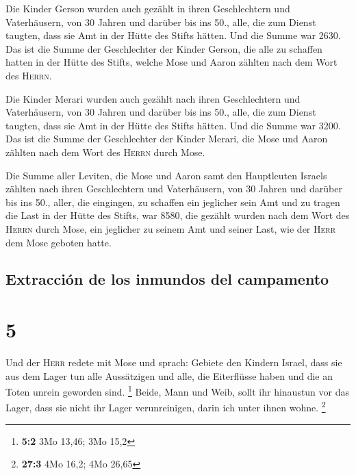  Die Kinder Gerson wurden auch gezählt in ihren
Geschlechtern und Vaterhäusern,  von 30 Jahren und
darüber bis ins 50., alle, die zum Dienst taugten, dass sie Amt in der
Hütte des Stifts hätten.  Und die Summe war 2630.
 Das ist die Summe der Geschlechter der Kinder Gerson,
die alle zu schaffen hatten in der Hütte des Stifts, welche Mose und
Aaron zählten nach dem Wort des \textsc{Herrn}.

 Die Kinder Merari wurden auch gezählt nach ihren
Geschlechtern und Vaterhäusern,  von 30 Jahren und
darüber bis ins 50., alle, die zum Dienst taugten, dass sie Amt in der
Hütte des Stifts hätten.  Und die Summe war 3200.
 Das ist die Summe der Geschlechter der Kinder Merari,
die Mose und Aaron zählten nach dem Wort des \textsc{Herrn} durch Mose.

 Die Summe aller Leviten, die Mose und Aaron samt den
Hauptleuten Israels zählten nach ihren Geschlechtern und Vaterhäusern,
 von 30 Jahren und darüber bis ins 50., aller, die
eingingen, zu schaffen ein jeglicher sein Amt und zu tragen die Last in
der Hütte des Stifts,  war 8580,  die
gezählt wurden nach dem Wort des \textsc{Herrn} durch Mose, ein
jeglicher zu seinem Amt und seiner Last, wie der \textsc{Herr} dem Mose
geboten hatte.

\hypertarget{extracciuxf3n-de-los-inmundos-del-campamento}{%
\subsection{Extracción de los inmundos del
campamento}\label{extracciuxf3n-de-los-inmundos-del-campamento}}

\hypertarget{section-4}{%
\section{5}\label{section-4}}

 Und der \textsc{Herr} redete mit Mose und sprach:
 Gebiete den Kindern Israel, dass sie aus dem Lager tun
alle Aussätzigen und alle, die Eiterflüsse haben und die an Toten unrein
geworden sind. \footnote{\textbf{5:2} 3Mo 13,46; 3Mo 15,2}
 Beide, Mann und Weib, sollt ihr hinaustun vor das Lager,
dass sie nicht ihr Lager verunreinigen, darin ich unter ihnen wohne.
\footnote{\textbf{27:3} 4Mo 16,2; 4Mo 26,65}


